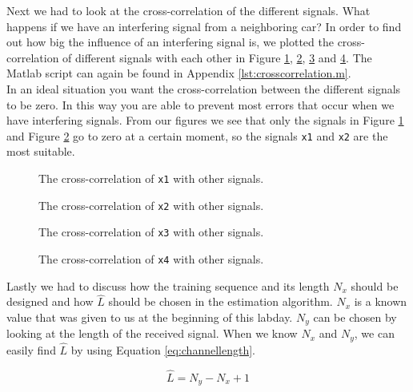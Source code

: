 \documentclass[final]{scrreprt} %
\begin{document}
Next we had to look at the cross-correlation of the different signals. 
What happens if we have an interfering signal from a neighboring car?
In order to find out how big the influence of an interfering signal is, we plotted the cross-correlation of different signals with each other in Figure \ref{fig:cross1}, \ref{fig:cross2}, \ref{fig:cross3} and \ref{fig:cross4}.
The Matlab script can again be found in Appendix \ref{lst:crosscorrelation.m}.
\\
In an ideal situation you want the cross-correlation between the different signals to be zero. 
In this way you are able to prevent most errors that occur when we have interfering signals. 
From our figures we see that only the signals in Figure \ref{fig:cross1} and Figure \ref{fig:cross2} go to zero at a certain moment, so the signals \texttt{x1} and \texttt{x2} are the most suitable.

\begin{figure}[H]
	\centering
    	\setlength\figureheight{6cm}
    	\setlength\figurewidth{10cm}
    	    	
    	\caption{The cross-correlation of \texttt{x1} with other signals.}
    	\label{fig:cross1}
\end{figure}

\begin{figure}[H]
	\centering
    	\setlength\figureheight{6cm}
    	\setlength\figurewidth{10cm}
    	    	
    	\caption{The cross-correlation of \texttt{x2} with other signals.}
    	\label{fig:cross2}
\end{figure}

\begin{figure}[H]
	\centering
    	\setlength\figureheight{6cm}
    	\setlength\figurewidth{10cm}
    	    	
    	\caption{The cross-correlation of \texttt{x3} with other signals.}
    	\label{fig:cross3}
\end{figure}

\begin{figure}[H]
	\centering
    	\setlength\figureheight{6cm}
    	\setlength\figurewidth{10cm}
    	    	
    	\caption{The cross-correlation of \texttt{x4} with other signals.}
    	\label{fig:cross4}
\end{figure}

Lastly we had to discuss how the training  sequence and its length $N_x$ should be designed and how $\hat{L}$ should be chosen in the estimation algorithm.
$N_x$ is a known value that was given to us at the beginning of this labday. 
$N_y$ can be chosen by looking at the length of the received signal.
When we know $N_x$ and $N_y$, we can easily find $\hat{L}$ by using Equation \ref{eq:channellength}.

\begin{equation}
\hat{L}=N_y - N_x +1
\label{eq:channellength}
\end{equation}
\end{document}
